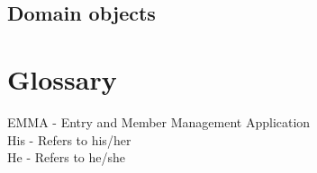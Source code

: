 \documentclass[10pt,a4paper]{article}
\begin{document}
\subsection{Domain objects}
\section{Glossary}
EMMA - Entry and Member Management Application\\
His - Refers to his/her\\
He - Refers to he/she
\end{document}
